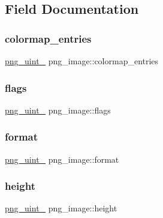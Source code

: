\subsection{Field Documentation}
\mbox{\label{structpng__image_a48bf1c6518f03da900f41cd9aa5ae5b7}} 
\subsubsection{\texorpdfstring{colormap\+\_\+entries}{colormap\_entries}}
{\footnotesize\ttfamily \hyperlink{libpng16_2pngconf_8h_aed373ad2e16fd6df7ccfa96329441d0d}{png\+\_\+uint\+\_} png\+\_\+image\+::colormap\+\_\+entries}

\mbox{\label{structpng__image_ab9519ecd9acf79b507dad566cc3b379f}} 
\subsubsection{\texorpdfstring{flags}{flags}}
{\footnotesize\ttfamily \hyperlink{libpng16_2pngconf_8h_aed373ad2e16fd6df7ccfa96329441d0d}{png\+\_\+uint\+\_} png\+\_\+image\+::flags}

\mbox{\label{structpng__image_a8a7469310ce4682932b0bc94624f35d1}} 
\subsubsection{\texorpdfstring{format}{format}}
{\footnotesize\ttfamily \hyperlink{libpng16_2pngconf_8h_aed373ad2e16fd6df7ccfa96329441d0d}{png\+\_\+uint\+\_} png\+\_\+image\+::format}

\mbox{\label{structpng__image_aaf3cb3eb97ee0938a5e870a96fd1fa48}} 
\subsubsection{\texorpdfstring{height}{height}}
{\footnotesize\ttfamily \hyperlink{libpng16_2pngconf_8h_aed373ad2e16fd6df7ccfa96329441d0d}{png\+\_\+uint\+\_} png\+\_\+image\+::height}

